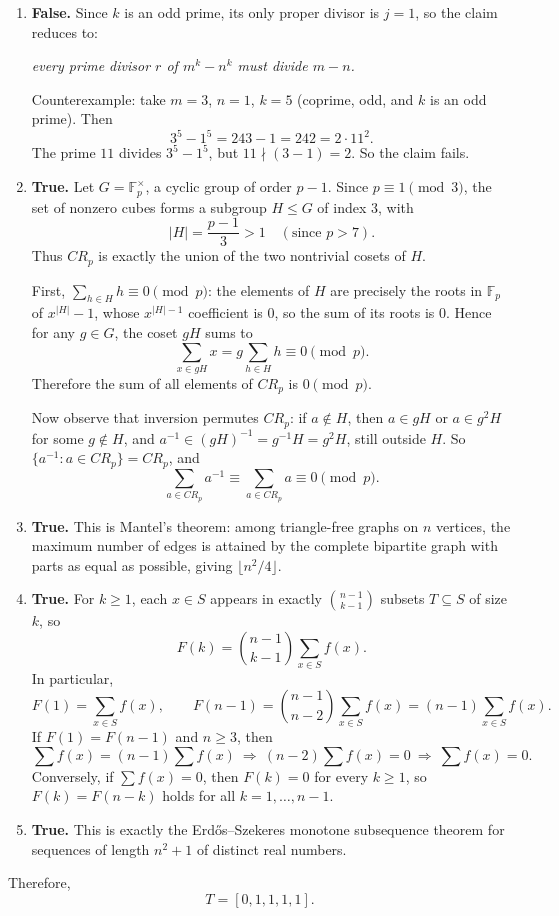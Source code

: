 \SolutionPage
\small
\begin{enumerate}[label=\textbf{\Alph*.},leftmargin=*]

\item \textbf{False.}
Since $k$ is an odd prime, its only proper divisor is $j=1$, so the claim reduces to:

\emph{every prime divisor $r$ of $m^k-n^k$ must divide $m-n$.}

Counterexample: take $m=3$, $n=1$, $k=5$ (coprime, odd, and $k$ is an odd prime).
Then
\[
3^5-1^5=243-1=242=2\cdot 11^2.
\]
The prime $11$ divides $3^5-1^5$, but $11\nmid (3-1)=2$.
So the claim fails.

\item \textbf{True.}
Let $G=\mathbb{F}_p^\times$, a cyclic group of order $p-1$.
Since $p\equiv 1\pmod 3$, the set of nonzero cubes forms a subgroup $H\le G$ of index $3$, with
\[
|H|=\frac{p-1}{3}>1 \quad (\text{since }p>7).
\]
Thus $CR_p$ is exactly the union of the two nontrivial cosets of $H$.

First, $\sum_{h\in H} h\equiv 0\pmod p$:
the elements of $H$ are precisely the roots in $\mathbb{F}_p$ of $x^{|H|}-1$, whose $x^{|H|-1}$ coefficient is $0$, so the sum of its roots is $0$.
Hence for any $g\in G$, the coset $gH$ sums to
\[
\sum_{x\in gH} x = g\sum_{h\in H} h \equiv 0 \pmod p.
\]
Therefore the sum of all elements of $CR_p$ is $0\pmod p$.

Now observe that inversion permutes $CR_p$:
if $a\notin H$, then $a\in gH$ or $a\in g^2H$ for some $g\notin H$, and $a^{-1}\in (gH)^{-1}=g^{-1}H=g^2H$, still outside $H$.
So $\{a^{-1}:a\in CR_p\}=CR_p$, and
\[
\sum_{a\in CR_p} a^{-1}\equiv \sum_{a\in CR_p} a \equiv 0\pmod p.
\]

\item \textbf{True.}
This is Mantel’s theorem: among triangle-free graphs on $n$ vertices, the maximum number of edges is attained by the complete bipartite graph with parts as equal as possible, giving $\lfloor n^2/4\rfloor$.

\item \textbf{True.}
For $k\ge 1$, each $x\in S$ appears in exactly $\binom{n-1}{k-1}$ subsets $T\subseteq S$ of size $k$, so
\[
F(k)=\binom{n-1}{k-1}\sum_{x\in S} f(x).
\]
In particular,
\[
F(1)=\sum_{x\in S} f(x),
\qquad
F(n-1)=\binom{n-1}{n-2}\sum_{x\in S} f(x)=(n-1)\sum_{x\in S} f(x).
\]
If $F(1)=F(n-1)$ and $n\ge 3$, then
\[
\sum f(x)=(n-1)\sum f(x)\ \Longrightarrow\ (n-2)\sum f(x)=0\ \Longrightarrow\ \sum f(x)=0.
\]
Conversely, if $\sum f(x)=0$, then $F(k)=0$ for every $k\ge 1$, so $F(k)=F(n-k)$ holds for all $k=1,\dots,n-1$.

\item \textbf{True.}
This is exactly the Erd\H{o}s--Szekeres monotone subsequence theorem for sequences of length $n^2+1$ of distinct real numbers.

\end{enumerate}

Therefore,
\[
T=[0,1,1,1,1].
\]


\NextPage
